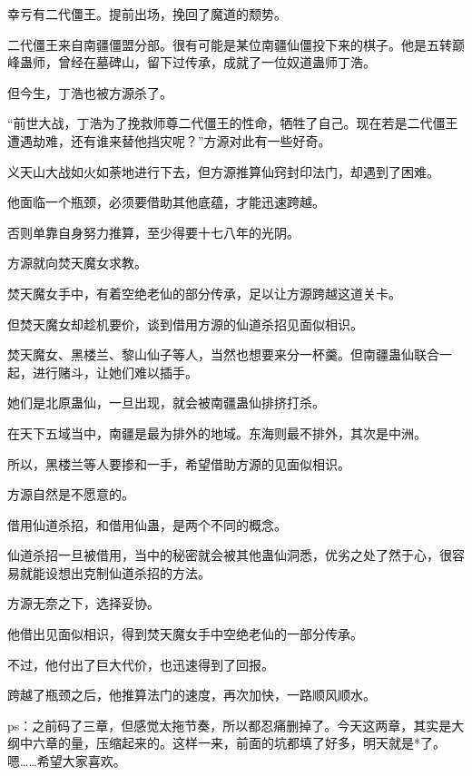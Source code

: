 \begin{this_body}
幸亏有二代僵王。提前出场，挽回了魔道的颓势。

二代僵王来自南疆僵盟分部。很有可能是某位南疆仙僵投下来的棋子。他是五转巅峰蛊师，曾经在墓碑山，留下过传承，成就了一位奴道蛊师丁浩。

但今生，丁浩也被方源杀了。

“前世大战，丁浩为了挽救师尊二代僵王的性命，牺牲了自己。现在若是二代僵王遭遇劫难，还有谁来替他挡灾呢？”方源对此有一些好奇。

义天山大战如火如荼地进行下去，但方源推算仙窍封印法门，却遇到了困难。

他面临一个瓶颈，必须要借助其他底蕴，才能迅速跨越。

否则单靠自身努力推算，至少得要十七八年的光阴。

方源就向焚天魔女求教。

焚天魔女手中，有着空绝老仙的部分传承，足以让方源跨越这道关卡。

但焚天魔女却趁机要价，谈到借用方源的仙道杀招见面似相识。

焚天魔女、黑楼兰、黎山仙子等人，当然也想要来分一杯羹。但南疆蛊仙联合一起，进行赌斗，让她们难以插手。

她们是北原蛊仙，一旦出现，就会被南疆蛊仙排挤打杀。

在天下五域当中，南疆是最为排外的地域。东海则最不排外，其次是中洲。

所以，黑楼兰等人要掺和一手，希望借助方源的见面似相识。

方源自然是不愿意的。

借用仙道杀招，和借用仙蛊，是两个不同的概念。

仙道杀招一旦被借用，当中的秘密就会被其他蛊仙洞悉，优劣之处了然于心，很容易就能设想出克制仙道杀招的方法。

方源无奈之下，选择妥协。

他借出见面似相识，得到焚天魔女手中空绝老仙的一部分传承。

不过，他付出了巨大代价，也迅速得到了回报。

跨越了瓶颈之后，他推算法门的速度，再次加快，一路顺风顺水。

ps：之前码了三章，但感觉太拖节奏，所以都忍痛删掉了。今天这两章，其实是大纲中六章的量，压缩起来的。这样一来，前面的坑都填了好多，明天就是*了。嗯……希望大家喜欢。

\end{this_body}


